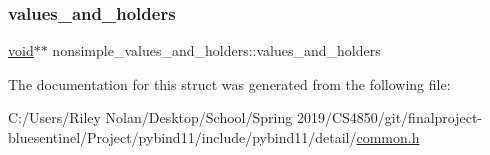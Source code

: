 \subsubsection{\texorpdfstring{values\_and\_holders}{values\_and\_holders}}
{\footnotesize\ttfamily \mbox{\hyperlink{_s_d_l__opengles2__gl2ext_8h_ae5d8fa23ad07c48bb609509eae494c95}{void}}$\ast$$\ast$ nonsimple\+\_\+values\+\_\+and\+\_\+holders\+::values\+\_\+and\+\_\+holders}



The documentation for this struct was generated from the following file\+:\begin{DoxyCompactItemize}
\item 
C\+:/\+Users/\+Riley Nolan/\+Desktop/\+School/\+Spring 2019/\+C\+S4850/git/finalproject-\/bluesentinel/\+Project/pybind11/include/pybind11/detail/\mbox{\hyperlink{detail_2common_8h}{common.\+h}}\end{DoxyCompactItemize}
